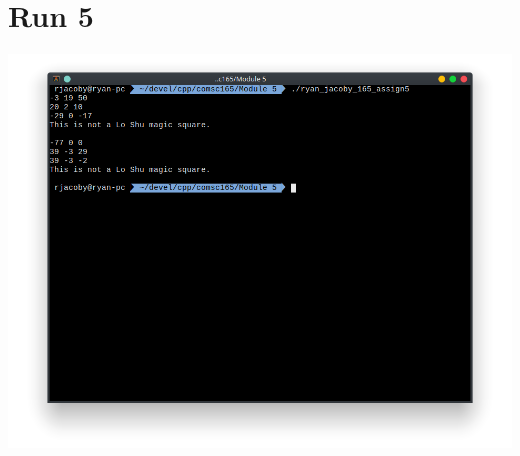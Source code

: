 \documentclass[letterpaper, 11pt]{article}
\begin{document}
\section*{Run 5}
\includegraphics[scale=0.5]{run5.png} \\
\end{document}
